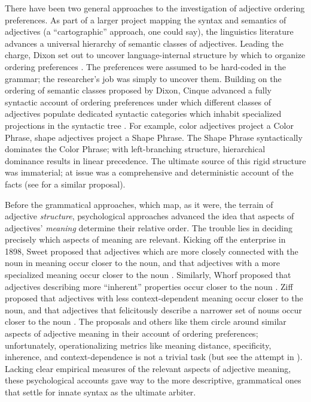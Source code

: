 \documentclass{pnastwo}
\begin{document}
\begin{article}
There have been two general approaches to the investigation of adjective ordering preferences. 
As part of a larger project mapping the syntax and semantics of adjectives (a ``cartographic'' approach, one could say), the linguistics literature advances a universal hierarchy of semantic classes of adjectives. Leading the charge, Dixon set out to uncover language-internal structure by which to organize ordering preferences \cite{dixon1982}. The preferences were assumed to be hard-coded in the grammar; the researcher's job was simply to uncover them. 
Building on the ordering of semantic classes proposed by Dixon, Cinque advanced a fully syntactic account of ordering preferences under which different classes of adjectives populate dedicated syntactic categories which inhabit specialized projections in the syntactic tree \cite{cinque1994}. For example, color adjectives project a Color Phrase, shape adjectives project a Shape Phrase. The Shape Phrase syntactically dominates the Color Phrase; with left-branching structure, hierarchical dominance results in linear precedence. The ultimate source of this rigid structure was immaterial; at issue was a comprehensive and deterministic account of the facts (see \cite{scott2002} for a similar proposal).

Before the grammatical approaches, which map, as it were, the terrain of adjective \emph{structure}, psychological approaches advanced the idea that aspects of adjectives' \emph{meaning} determine their relative order. The trouble lies in deciding precisely which aspects of meaning are relevant. 
Kicking off the enterprise in 1898, Sweet proposed that adjectives which are more closely connected with the noun in meaning occur closer to the noun, and that adjectives with a more specialized meaning occur closer to the noun \cite{sweet1898}. Similarly, Whorf proposed that adjectives describing more ``inherent'' properties occur closer to the noun \cite{whorf1945}. Ziff proposed that adjectives with less context-dependent meaning occur closer to the noun, and that adjectives that felicitously describe a narrower set of nouns occur closer to the noun \cite{ziff1960}. The proposals and others like them circle around similar aspects of adjective meaning in their account of ordering preferences; unfortunately, operationalizing metrics like meaning distance, specificity, inherence, and context-dependence is not a trivial task (but see the attempt in \cite{martin1969determinants}). 
Lacking clear empirical measures of the relevant aspects of adjective meaning, these psychological accounts gave way to the more descriptive, grammatical ones that settle for innate syntax as the ultimate arbiter. 


\end{article}
\end{document}
